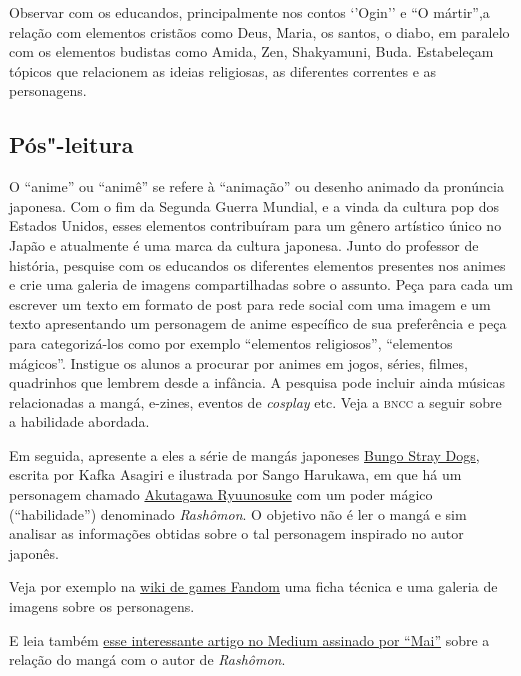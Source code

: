\documentclass[12pt]{extarticle}
\begin{document}
Observar com os educandos, principalmente nos contos `'Ogin'' e ``O mártir'',a relação
com elementos cristãos como Deus, Maria, os santos, o diabo, em paralelo com os
elementos budistas como Amida, Zen, Shakyamuni, Buda.  Estabeleçam tópicos que
relacionem as ideias religiosas, as diferentes correntes e as personagens.

\subsection{Pós"-leitura}

O ``anime'' ou ``animê'' se refere à ``animação'' ou desenho animado
da pronúncia japonesa. Com o fim da Segunda Guerra Mundial, e a vinda da
cultura pop dos Estados Unidos, esses elementos contribuíram para um gênero
artístico único no Japão e atualmente é uma marca da cultura japonesa. Junto do 
professor de história, pesquise 
com os educandos os diferentes elementos presentes nos
animes e crie uma galeria de imagens compartilhadas sobre o assunto. 
Peça para cada um escrever um texto em formato de post para rede social
com uma imagem e um texto apresentando um personagem de anime específico de 
sua preferência e peça para categorizá-los como por exemplo
``elementos religiosos'', ``elementos mágicos''. 
Instigue os alunos a procurar por animes em jogos, séries, filmes, quadrinhos que 
lembrem desde a infância. A pesquisa pode incluir ainda músicas relacionadas 
a mangá, e-zines, eventos de \textit{cosplay} etc.
Veja a \textsc{bncc} a seguir sobre a habilidade abordada.

Em seguida, apresente a eles a série de mangás 
japoneses \href{https://pt.wikipedia.org/wiki/Bungo_Stray_Dogs}{Bungo Stray Dogs}, escrita por 
Kafka Asagiri e ilustrada por Sango Harukawa, em que há um personagem chamado 
\href{https://villains.fandom.com/wiki/Akutagawa_Ryuunosuke}{Akutagawa Ryuunosuke}
com um poder mágico (``habilidade'') denominado \textit{Rashômon}. 
O objetivo não é ler o mangá e sim analisar as informações obtidas sobre o 
tal personagem inspirado no autor japonês. 

Veja por exemplo na \href{https://villains.fandom.com/wiki/Akutagawa_Ryuunosuke}{wiki de games Fandom}  
uma ficha técnica e uma galeria de imagens sobre os personagens. 

E leia também 
\href{https://bungakunerd.medium.com/ryunosuke-akutagawa-de-escritor-solit\%C3\%A1rio-a-mafioso-desalmado-b9f9dd1f5f39}%
{esse interessante artigo no Medium assinado por ``Mai''} 
sobre a relação do mangá com o autor de \textit{Rashômon}. 
\end{document}
